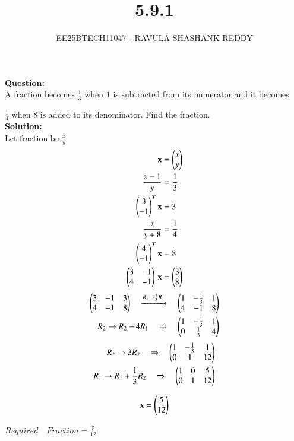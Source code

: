 \documentclass[journal]{article}
\begin{document}
	
	
	\vspace{3cm}
	
\title{5.9.1}
\author{EE25BTECH11047 - RAVULA SHASHANK REDDY}
\maketitle
\hrulefill
\bigskip 

\renewcommand{\thetable}{\theenumi}
\setlength{\intextsep}{10pt}

\textbf{Question:} \\

A fraction becomes $\tfrac{1}{3}$ when $1$ is subtracted from its numerator and it becomes 

$\tfrac{1}{4}$ when $8$ is added to its denominator. Find the fraction.\\

 \textbf{Solution:}\\
 
Let fraction be  $\tfrac{x}{y}$  
\begin{align}
\mathbf{x}&=\begin{pmatrix}x \\ y\end{pmatrix}\\
\frac{x-1}{y}&=\frac{1}{3}\\
\begin{pmatrix}3 \\ -1\end{pmatrix}^T\mathbf{x}&=3\\
\frac{x}{y+8}&=\frac{1}{4}\\
\begin{pmatrix}4 \\ -1\end{pmatrix}^T\mathbf{x}&=8\\
\begin{pmatrix}3 & -1 \\ 4 & -1\end{pmatrix}\,\mathbf{x} &= \begin{pmatrix}3 \\ 8\end{pmatrix}
\end{align}
\begin{align}
\begin{pmatrix}
3 & -1 & 3 \\
4 & -1 & 8
\end{pmatrix} \quad
\xrightarrow{R_1 \to \frac{1}{3} R_1}  \quad
\begin{pmatrix}
1 & -\frac{1}{3} & 1 \\
4 & -1 & 8
\end{pmatrix} \\
R_2 \to R_2 - 4 R_1 \quad \Rightarrow \quad
\begin{pmatrix}
1 & -\frac{1}{3} & 1 \\
0 & \frac{1}{3} & 4
\end{pmatrix}
\end{align}
\begin{align}
R_2 \to 3 R_2 \quad \Rightarrow \quad
\begin{pmatrix}
1 & -\frac{1}{3} & 1 \\
0 & 1 & 12
\end{pmatrix} \\
R_1 \to R_1 + \frac{1}{3} R_2 \quad \Rightarrow \quad
\begin{pmatrix}
1 & 0 & 5 \\
0 & 1 & 12
\end{pmatrix} 
\end{align}


\begin{align}
\mathbf{x}=\begin{pmatrix}5 \\ 12\end{pmatrix}
\end{align}
\begin{center}

$\boxed{Required\quad Fraction = \frac{5}{12}}$
\end{center}
\end{document}
